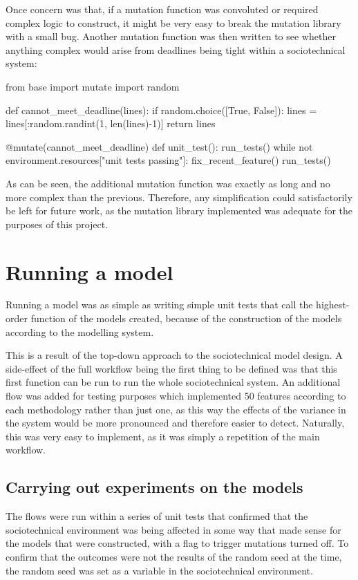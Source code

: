 Once concern was that, if a mutation function was convoluted or required complex logic to construct, it might be very easy to break the mutation library with a small bug. Another mutation function was then written to see whether anything complex would arise from deadlines being tight within a sociotechnical system:

\begin{pyglist}[language = python, encoding = utf8]
from base import mutate
import random

def cannot_meet_deadline(lines):
    if random.choice([True, False]):
        lines = lines[:random.randint(1, len(lines)-1)]
    return lines

@mutate(cannot_meet_deadline)
def unit_test():
    run_tests()
    while not environment.resources["unit tests passing"]:
        fix_recent_feature()
        run_tests()
\end{pyglist}\par
As can be seen, the additional mutation function was exactly as long and no more complex than the previous. Therefore, any simplification could satisfactorily be left for future work, as the mutation library implemented was adequate for the purposes of this project.\par

\section{Running a model}
Running a model was as simple as writing simple unit tests that call the highest-order function of the models created, because of the construction of the models according to the modelling system. \par

This is a result of the top-down approach to the sociotechnical model design. A side-effect of the full workflow being the first thing to be defined was that this first function can be run to run the whole sociotechnical system. An additional flow was added for testing purposes which implemented 50 features according to each methodology rather than just one, as this way the effects of the variance in the system would be more pronounced and therefore easier to detect. Naturally, this was very easy to implement, as it was simply a repetition of the main workflow.\par

\subsection{Carrying out experiments on the models}
The flows were run within a series of unit tests that confirmed that the sociotechnical environment was being affected in some way that made sense for the models that were constructed, with a flag to trigger mutations turned off. To confirm that the outcomes were not the results of the random seed at the time, the random seed was set as a variable in the sociotechnical environment.\par

